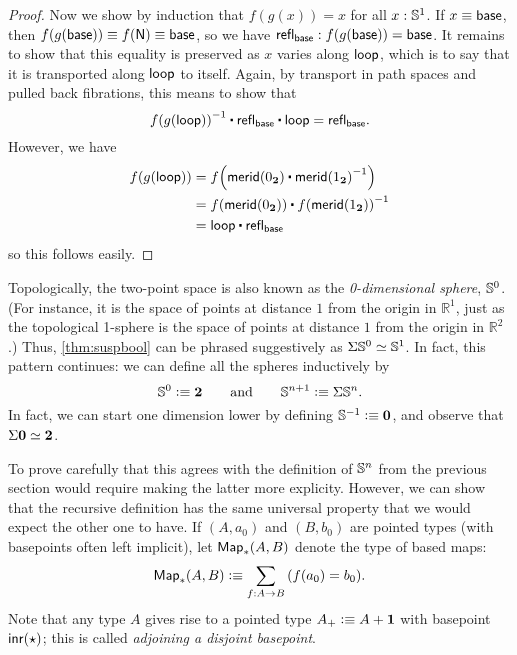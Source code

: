 \begin{proof}
  Now we show by induction that $f(g(x))=x$ for all $x:\mathbb{S}^1$.
  If $x\equiv \mathsf{base}$, then $f(g(\mathsf{base}))\equiv f(\mathsf{N})\equiv\mathsf{base}$, so we have $\mathsf{refl}_{\mathsf{base}} : f(g(\mathsf{base}))=\mathsf{base}$.
  It remains to show that this equality is preserved as $x$ varies along $\mathsf{loop}$, which is to say that it is transported along $\mathsf{loop}$ to itself.
  Again, by transport in path spaces and pulled back fibrations, this means to show that
  \[ \opp{\ap f {\ap g {\lloop}}} \ct \refl{\base} \ct \lloop = \refl{\base}.\]
  However, we have
  \begin{align*}
    \ap f {\ap g {\lloop}} &= \ap f {\merid(\bfalse) \ct \opp{\merid(\btrue)}}\\
    &= \ap f {\merid(\bfalse)} \ct \opp{\ap f {\merid(\btrue)}}\\
    &= \lloop \ct \refl{\base}
  \end{align*}
  so this follows easily.
\end{proof}

Topologically, the two-point space \bool is also known as the \emph{0-dimensional sphere}, $\mathbb{S}^0$.
(For instance, it is the space of points at distance $1$ from the origin in $\mathbb{R}^1$, just as the topological 1-sphere is the space of points at distance $1$ from the origin in $\mathbb{R}^2$.)
Thus, \autoref{thm:suspbool} can be phrased suggestively as $\Sigma\mathbb{S}^0 \simeq \mathbb{S}^1$.
%
In fact, this pattern continues: we can define all the spheres inductively by
\begin{equation}\label{eq:Snsusp}
  \Sn^0 \defeq \bool
  \qquad\text{and}\qquad
  \Sn^{n+1} \defeq \susp \Sn^n.
\end{equation}
In fact, we can start one dimension lower by defining $\mathbb{S}^{-1}\vcentcolon\equiv \mathbf{0}$, and observe that $\Sigma\mathbf{0} \simeq \mathbf{2}$.

To prove carefully that this agrees with the definition of $\mathbb{S}^n$ from the previous section would require making the latter more explicity.
However, we can show that the recursive definition has the same universal property that we would expect the other one to have.
If $(A,a_0)$ and $(B,b_0)$ are pointed types (with basepoints often left implicit), let $\mathsf{Map}_*(A,B)$ denote the type of based maps:
%
\[ \Map_*(A,B) \defeq \sm{f:A\to B} (f(a_0)=b_0). \]
Note that any type $A$ gives rise to a pointed type $A_+ \vcentcolon\equiv A+\mathbf{1}$ with basepoint ${\mathsf{inr}}(\star)$; this is called \emph{adjoining a disjoint basepoint}.
%
%
%

